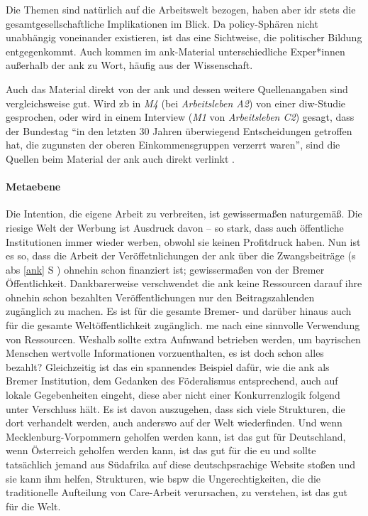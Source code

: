 Die Themen sind natürlich auf die Arbeitswelt bezogen, haben aber \gls{idr} stets die gesamtgesellschaftliche Implikationen im Blick. Da policy-Sphären nicht unabhängig voneinander existieren, ist das eine Sichtweise, die politischer Bildung entgegenkommt. 
Auch kommen im \gls{ank}-Material unterschiedliche Exper*innen außerhalb der \gls{ank} zu Wort, häufig aus der Wissenschaft.

Auch das Material direkt von der \gls{ank} und dessen weitere Quellenangaben sind vergleichsweise gut. Wird \gls{zb} in \emph{M4} (bei \emph{Arbeitsleben A2}) von einer \gls{diw}-Studie gesprochen, oder wird in einem Interview (\emph{M1} von \emph{Arbeitsleben C2}) gesagt, dass der Bundestag \enquote{in den letzten 30 Jahren überwiegend Entscheidungen getroffen hat, die zugunsten der oberen Einkommensgruppen verzerrt waren}, sind die Quellen beim Material der \gls{ank} auch direkt verlinkt \autocite{Elsasser.2017}. 

\paragraph{Metaebene}
Die Intention, die eigene Arbeit zu verbreiten, ist gewissermaßen naturgemäß. Die riesige Welt der Werbung ist Ausdruck davon -- so stark, dass auch öffentliche Institutionen immer wieder werben, obwohl sie keinen Profitdruck haben. 
Nun ist es so, dass die Arbeit der Veröffetnlichungen der \gls{ank} über die Zwangsbeiträge (\gls{s} \gls{abs} \ref{ank} \gls{S} \pageref{ank}) ohnehin schon finanziert ist; gewissermaßen von der Bremer Öffentlichkeit. Dankbarerweise verschwendet die \gls{ank} keine Ressourcen darauf ihre ohnehin schon bezahlten Veröffentlichungen nur den Beitragszahlenden zugänglich zu machen. Es ist für die gesamte Bremer- und darüber hinaus auch für die gesamte Weltöffentlichkeit zugänglich. \Gls{me} nach eine sinnvolle Verwendung von Ressourcen. Weshalb sollte extra Aufnwand betrieben werden, um bayrischen Menschen wertvolle Informationen vorzuenthalten, es ist doch schon alles bezahlt? 
Gleichzeitig ist das ein spannendes Beispiel dafür, wie die \gls{ank} als Bremer Institution, dem Gedanken des Föderalismus entsprechend, auch auf lokale Gegebenheiten eingeht, diese aber nicht einer Konkurrenzlogik folgend unter Verschluss hält. Es ist davon auszugehen, dass sich viele Strukturen, die dort verhandelt werden, auch anderswo auf der Welt wiederfinden. Und wenn Mecklenburg-Vorpommern geholfen werden kann, ist das gut für Deutschland, wenn Österreich geholfen werden kann, ist das gut für die \gls{eu} und sollte tatsächlich jemand aus Südafrika auf diese deutschpsrachige Website stoßen und sie kann ihm helfen, Strukturen, wie \gls{bspw} die Ungerechtigkeiten, die die traditionelle Aufteilung von Care-Arbeit verursachen, zu verstehen, ist das gut für die Welt. 

